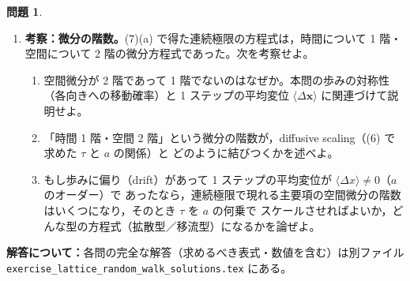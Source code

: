 \documentclass[dvipdfmx, uplatex]{jsarticle}
\newcommand{\bx}{\bm{x}}
\theoremstyle{definition}
\newtheorem{prob}{問題}
\begin{document}
\begin{prob}
\begin{enumerate}
\begin{enumerate}
等しく相関がないこと，の 3 点に触れて説明せよ。格子の離散対称性（$90^\circ$ 回転 $C_4$）から
連続の回転対称性 $O(2)$ が\emph{創発}的に拡大する，という言葉でまとめよ。
\end{enumerate}
\item \textbf{考察：微分の階数。}(7)(a) で得た連続極限の方程式は，時間について 1 階・空間について
2 階の微分方程式であった。次を考察せよ。
\begin{enumerate}
\item 空間微分が 2 階であって 1 階でないのはなぜか。本問の歩みの対称性（各向きへの移動確率）と
1 ステップの平均変位 $\langle\Delta\bx\rangle$ に関連づけて説明せよ。
\item 「時間 1 階・空間 2 階」という微分の階数が，diffusive scaling（(6) で求めた $\tau$ と $a$ の関係）と
どのように結びつくかを述べよ。
\item もし歩みに偏り（drift）があって 1 ステップの平均変位が $\langle\Delta x\rangle\neq0$（$a$ のオーダー）で
あったなら，連続極限で現れる主要項の空間微分の階数はいくつになり，そのとき $\tau$ を $a$ の何乗で
スケールさせればよいか，どんな型の方程式（拡散型／移流型）になるかを論ぜよ。
\end{enumerate}
\end{enumerate}
\end{prob}

\bigskip
{\sloppy
\noindent\textbf{解答について：}各問の完全な解答（求めるべき表式・数値を含む）は別ファイル
\texttt{exercise\_lattice\_random\_walk\_solutions.tex} にある。
\par}
\end{document}
